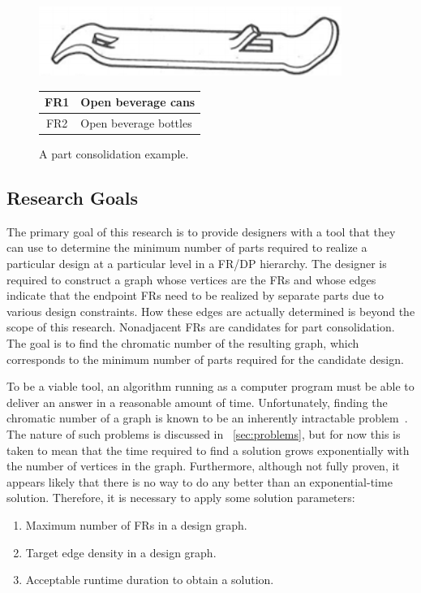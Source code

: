 \begin{figure}[H]
  \centering
  \includegraphics{opener}

  \bigskip

  \begin{tabular}{|c|l|}
    \hline
    FR1 & Open beverage cans \\
    \hline
    FR2 & Open beverage bottles \\
    \hline
  \end{tabular}
  \caption{A part consolidation example.}
  \label{fig:opener}
\end{figure}

\subsection{Research Goals}\label{sec:sub:goals}

The primary goal of this research is to provide designers with a tool that they can use to determine the minimum
number of parts required to realize a particular design at a particular level in a FR/DP hierarchy.  The designer
is required to construct a graph whose vertices are the FRs and whose edges indicate that the endpoint FRs need to
be realized by separate parts due to various design constraints.  How these edges are actually determined is beyond
the scope of this research.  Nonadjacent FRs are candidates for part consolidation.  The goal is to find the
chromatic number of the resulting graph, which corresponds to the minimum number of parts required for the
candidate design.

To be a viable tool, an algorithm running as a computer program must be able to deliver an answer in a reasonable
amount of time.  Unfortunately, finding the chromatic number of a graph is known to be an inherently intractable
problem~\cite{garey}.  The nature of such problems is discussed in \sectionname~\ref{sec:problems}, but for now
this is taken to mean that the time required to find a solution grows exponentially with the number of vertices in
the graph.  Furthermore, although not fully proven, it appears likely that there is no way to do any better than an
exponential-time solution.  Therefore, it is necessary to apply some solution parameters:
\begin{enumerate}
\item Maximum number of FRs in a design graph.
\item Target edge density in a design graph.
\item Acceptable runtime duration to obtain a solution.
\end{enumerate}

